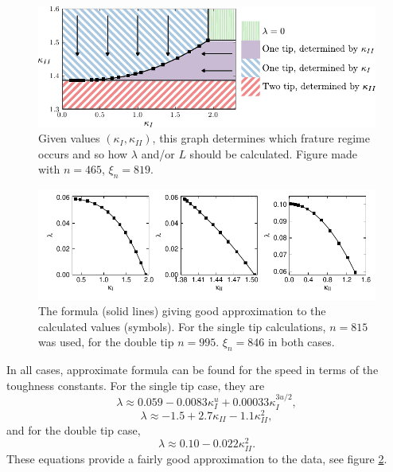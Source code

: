 \documentclass{jfm}
\begin{document}
\begin{figure}
 \centerline{
\includegraphics{./../../Graphs/catagory-edited.pdf}}
  \caption{Given values $(\kappa_I,\kappa_{II})$, this graph determines which
           frature regime occurs and so how $\lambda$ and/or $L$ should be 
           calculated. Figure made with $n=465$, $\xi_n = 819$.
           }\label{fig:catagory}
\end{figure}

\begin{figure}
 \centerline{
\includegraphics{./../../Graphs/overall-fit.pdf}}
  \caption{The formula (solid lines) giving good approximation to the 
           calculated values (symbols). For the single tip
           calculations, $n=815$ was used, for the double tip $n=995$. 
           $\xi_n = 846$ in both cases.  }\label{fig:overall-fit}
\end{figure}

In all cases, approximate formula can be found for the speed in terms
of the toughness constants. For the single tip case, they are
\begin{equation}
\lambda \approx 0.059 -0.0083 \kappa_I^u + 0.00033 \kappa_I^{3u/2},
\end{equation}
\begin{equation}
\lambda \approx -1.5 +2.7 \kappa_{II} -1.1 \kappa_{II}^2,
\end{equation}
and for the double tip case,
\begin{equation}
\lambda \approx 0.10 - 0.022\kappa_{II}^2.
\end{equation}
These equations provide a fairly good approximation to the data, see figure
\ref{fig:overall-fit}.
\end{document}
